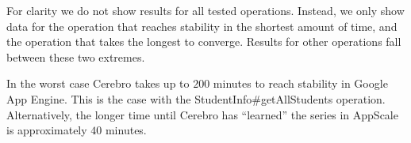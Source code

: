 For clarity we do not show results for all tested operations. Instead,
we only show data for the operation that reaches stability in the shortest
amount of time,
and the operation that takes the longest to converge.
Results for other operations fall between these two extremes.

In the worst case Cerebro takes up to $200$ minutes to 
reach stability in Google App Engine. This is the case with the
StudentInfo\#getAllStudents operation. 
Alternatively, the longer time until Cerebro has ``learned'' the series in
AppScale is approximately $40$ minutes.


